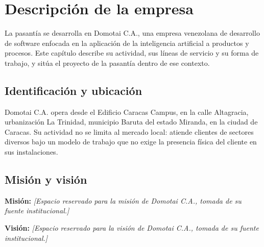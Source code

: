 %
%

\chapter{Descripción de la empresa}

La pasantía se desarrolla en Domotai C.A., una empresa venezolana de desarrollo de software
enfocada en la aplicación de la inteligencia artificial a productos y procesos. Este capítulo
describe su actividad, sus líneas de servicio y su forma de trabajo, y sitúa el proyecto de la
pasantía dentro de ese contexto.

\section{Identificación y ubicación}

Domotai C.A. opera desde el Edificio Caracas Campus, en la calle Altagracia, urbanización La
Trinidad, municipio Baruta del estado Miranda, en la ciudad de Caracas. Su actividad no se limita
al mercado local: atiende clientes de sectores diversos bajo un modelo de trabajo que no exige la
presencia física del cliente en sus instalaciones.

\section{Misión y visión}

\textbf{Misión:} \textit{[Espacio reservado para la misión de Domotai C.A., tomada de su fuente
institucional.]}

\textbf{Visión:} \textit{[Espacio reservado para la visión de Domotai C.A., tomada de su fuente
institucional.]}

